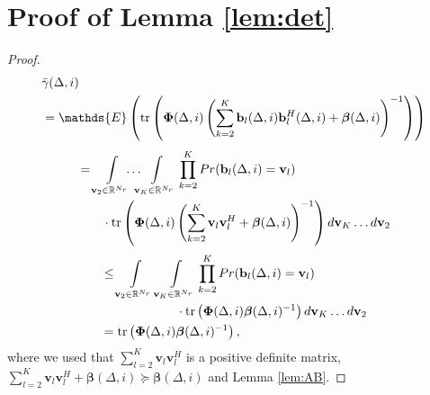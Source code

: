 \documentclass[conference, a4paper, 10pt]{IEEEtran}
\newcommand{\mx}[1]{\mathbf{#1}}
\newcommand{\bs}[1]{\boldsymbol{#1}}
\begin{document}
\section{Proof of Lemma \ref{lem:det}}
\label{Sec:L5}
\begin{proof}
\begin{align*}
& \bar{\gamma}(\Delta, i)
\\&= \mathds{E}\left( \textup{tr}\left( \bs{\Phi}(\Delta, i)  \left( \sum_{k=2}^K  \mx{b}_l(\Delta, i) \mx{b}_l^H(\Delta, i)  +\bs{\beta}(\Delta, i) \right)^{-1}  \right) \right)
\end{align*}
\begin{align*}
&=  \int\limits_{\mx{v}_2\in\mathbb{R}^{N_r}} \!\!\!\ldots\!\!\!  \int\limits_{\mx{v}_K\in\mathbb{R}^{N_r}}  \prod_{k=2}^K Pr(\mx{b}_l(\Delta, i)=\mx{v}_l)
\\& ~~~~~~\cdot \textup{tr}\left( \bs{\Phi}(\Delta, i)  \left( \sum_{k=2}^K  \mx{v}_l \mx{v}_l^H  +\bs{\beta}(\Delta, i) \right)^{-1} \right)
 d\mx{v}_K \ldots d\mx{v}_2
\end{align*}
\begin{align*}
& \leq \int\limits_{\mx{v}_2\in\mathbb{R}^{N_r}} \int\limits_{\mx{v}_K\in\mathbb{R}^{N_r}}  \prod_{k=2}^K Pr(\mx{b}_l(\Delta, i)=\mx{v}_l)
\\& ~~~~~~~~~~~~~~~~~~\cdot
\textup{tr}\left( \bs{\Phi}(\Delta, i)   \bs{\beta}(\Delta, i)^{-1} \right) d\mx{v}_K \ldots d\mx{v}_2
\\&= \textup{tr}\left( \bs{\Phi}(\Delta, i) \bs{\beta}(\Delta, i)^{-1} \right),
\nonumber
\end{align*}
where we used that $\sum_{l = 2}^K  \mx{v}_l \mx{v}_l^H$ is a positive definite matrix,
$\sum_{l = 2}^K  \mx{v}_l \mx{v}_l^H +\bs{\beta}(\Delta, i) \succeq \bs{\beta}(\Delta, i)$
and Lemma \ref{lem:AB}.
\end{proof}
\end{document}
